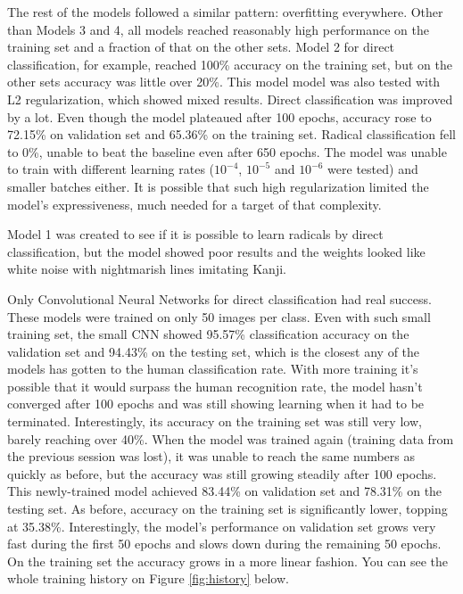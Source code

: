 \documentclass{article}
\begin{document}
\begin{CJK*}{UTF8}{min}
The rest of the models followed a similar pattern: overfitting everywhere. Other than Models 3 and 4, all models reached reasonably high performance on the training set and a fraction of that on the other sets. Model 2 for direct classification, for example, reached 100\% accuracy on the training set, but on the other sets accuracy was little over 20\%. This model model was also tested with L2 regularization, which showed mixed results. Direct classification was improved by a lot. Even though the model plateaued after 100 epochs, accuracy rose to 72.15\% on validation set and 65.36\% on the training set. Radical classification fell to 0\%, unable to beat the baseline even after 650 epochs. The model was unable to train with different learning rates ($10^{-4}$, $10^{-5}$ and $10^{-6}$ were tested) and smaller batches either. It is possible that such high regularization limited the model's expressiveness, much needed for a target of that complexity.

Model 1 was created to see if it is possible to learn radicals by direct classification, but the model showed poor results and the weights looked like white noise with nightmarish lines imitating Kanji.

Only Convolutional Neural Networks for direct classification had real success. These models were trained on only 50 images per class. Even with such small training set, the small CNN showed 95.57\% classification accuracy on the validation set and 94.43\% on the testing set, which is the closest any of the models has gotten to the human classification rate. With more training it's possible that it would surpass the human recognition rate, the model hasn't converged after 100 epochs and was still showing learning when it had to be terminated. Interestingly, its accuracy on the training set was still very low, barely reaching over 40\%.
When the model was trained again (training data from the previous session was lost), it was unable to reach the same numbers as quickly as before, but the accuracy was still growing steadily after 100 epochs. This newly-trained model achieved 83.44\% on validation set and 78.31\% on the testing set. As before, accuracy on the training set is significantly lower, topping at 35.38\%. Interestingly, the model's performance on validation set grows very fast during the first 50 epochs and slows down during the remaining 50 epochs. On the training set the accuracy grows in a more linear fashion. You can see the whole training history on Figure \ref{fig:history} below.


\end{CJK*}
\end{document}
